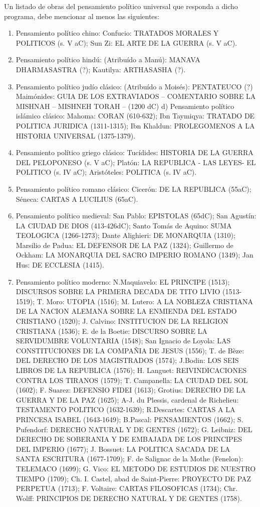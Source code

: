 \documentclass[
]{book}
\begin{document}
Un listado de obras del pensamiento político universal que responda a dicho programa, debe mencionar al menos las siguientes:

\begin{enumerate}
\def\labelenumi{\alph{enumi})}
\item
  Pensamiento político chino: Confucio: TRATADOS MORALES Y POLITICOS (s. V aC); Sun Zi: EL ARTE DE LA GUERRA (s. V aC).
\item
  Pensamiento político hindú: (Atribuído a Manú): MANAVA DHARMASASTRA (?); Kautilya: ARTHASASHA (?).
\item
  Pensamiento político judío clásico: (Atribuído a Moisés): PENTATEUCO (?) Maimónides: GUIA DE LOS EXTRAVIADOS -- COMENTARIO SOBRE LA MISHNAH -- MISHNEH TORAH -- (1200 dC) d) Pensamiento político islámico clásico: Mahoma: CORAN (610-632); Ibn Taymiqya: TRATADO DE POLITICA JURIDICA (1311-1315); Ibn Khaldun: PROLEGOMENOS A LA HISTORIA UNIVERSAL (1375-1379).
\item
  Pensamiento político griego clásico: Tucídides: HISTORIA DE LA GUERRA DEL PELOPONESO (s. V aC); Platón: LA REPUBLICA - LAS LEYES- EL POLITICO (s. IV aC); Aristóteles: POLITICA (s. IV aC).
\item
  Pensamiento político romano clásico: Cicerón: DE LA REPUBLICA (55aC); Séneca: CARTAS A LUCILIUS (65aC).
\item
  Pensamiento político medieval: San Pablo: EPISTOLAS (65dC); San Agustín: LA CIUDAD DE DIOS (413-426dC); Santo Tomás de Aquino: SUMA TEOLOGICA (1266-1273); Dante Alighieri: DE MONARQUIA (1310); Marsilio de Padua: EL DEFENSOR DE LA PAZ (1324); Guillermo de Ockham: LA MONARQUIA DEL SACRO IMPERIO ROMANO (1349); Jan Hus: DE ECCLESIA (1415).
\item
  Pensamiento político moderno: N.Maquiavelo: EL PRINCIPE (1513); DISCURSOS SOBRE LA PRIMERA DECADA DE TITO LIVIO (1513-1519); T. Moro: UTOPIA (1516); M. Lutero: A LA NOBLEZA CRISTIANA DE LA NACION ALEMANA SOBRE LA ENMIENDA DEL ESTADO CRISTIANO (1520); J. Calvino: INSTITUCION DE LA RELIGION CRISTIANA (1536); E. de la Boetie: DISCURSO SOBRE LA SERVIDUMBRE VOLUNTARIA (1548); San Ignacio de Loyola: LAS CONSTITUCIONES DE LA COMPAÑIA DE JESUS (1556); T. de Bèze: DEL DERECHO DE LOS MAGISTRADOS (1574); J.Bodin: LOS SEIS LIBROS DE LA REPUBLICA (1576); H. Languet: REIVINDICACIONES CONTRA LOS TIRANOS (1579); T. Campanella: LA CIUDAD DEL SOL (1602); F. Suarez: DEFENSIO FIDEI (1613); Grotius: DERECHO DE LA GUERRA Y DE LA PAZ (1625); A-J. du Plessis, cardenal de Richelieu: TESTAMENTO POLITICO (1632-1639); R.Descartes: CARTAS A LA PRINCESA ISABEL (1643-1649); B.Pascal: PENSAMIENTOS (1662); S. Pufendorf: DERECHO NATURAL Y DE GENTES (1672); G. Leibniz: DEL DERECHO DE SOBERANIA Y DE EMBAJADA DE LOS PRINCIPES DEL IMPERIO (1677); J. Bossuet: LA POLITICA SACADA DE LA SANTA ESCRITURA (1677-1709); F. de Salignac de la Mothe (Fenelon): TELEMACO (1699); G. Vico: EL METODO DE ESTUDIOS DE NUESTRO TIEMPO (1709); Ch. I. Castel, abad de Saint-Pierre: PROYECTO DE PAZ PERPETUA (1713); F. Voltaire: CARTAS FILOSOFICAS (1734); Chr. Wolff: PRINCIPIOS DE DERECHO NATURAL Y DE GENTES (1758).
\end{enumerate}
\end{document}
